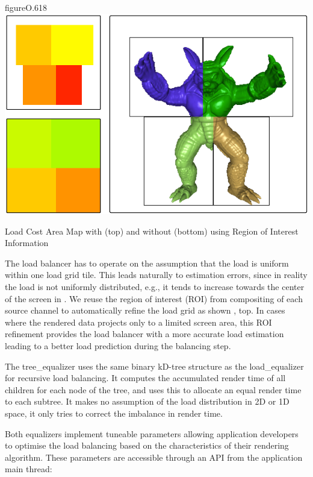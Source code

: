 \begin{wrapfloat}{figure}{O}{.618\textwidth}
  \includegraphics[width=.618\textwidth]{images/roi}
  \caption{Load Cost Area Map with (top) and without (bottom) using Region of Interest Information}
  \label{fROI}
\end{wrapfloat}

The load balancer has to operate on the assumption that the load is uniform
within one load grid tile. This leads naturally to estimation errors, since in
reality the load is not uniformly distributed, e.g., it tends to increase
towards the center of the screen in . We reuse the region of interest
(ROI) from compositing of each source channel to automatically refine the load
grid as shown , top. In cases where the rendered data projects only
to a limited screen area, this ROI refinement provides the load balancer with a
more accurate load estimation leading to a better load prediction during the
balancing step.

The \textsf{tree\_equalizer} uses the same binary kD-tree structure as the
\textsf{load\_equalizer} for recursive load balancing. It computes the
accumulated render time of all children for each node of the tree, and uses
this to allocate an equal render time to each subtree. It makes no assumption
of the load distribution in 2D or 1D space, it only tries to correct the
imbalance in render time.

Both equalizers implement tuneable parameters allowing application developers
to optimise the load balancing based on the characteristics of their rendering
algorithm. These parameters are accessible through an API from the application
main thread:

